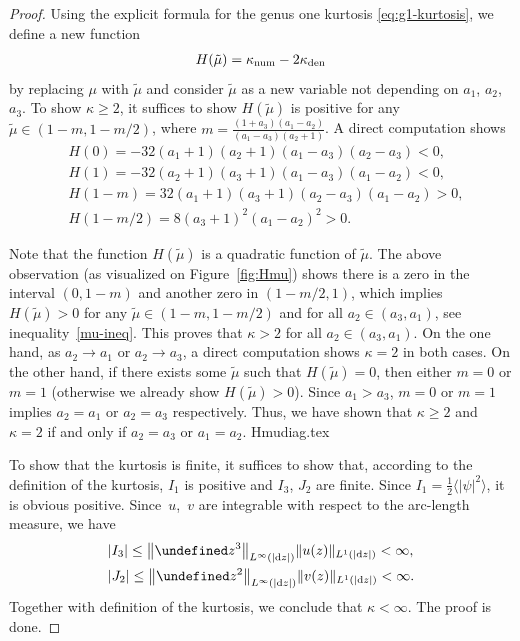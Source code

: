 \documentclass[pdftex]{sigma}
\numberwithin{equation}{section}
\let\Im\undefined
\DeclareMathOperator{\Im}{Im}
\def\ra{\rightarrow}
\begin{document}
\begin{proof}
Using the explicit formula for the genus one kurtosis \eqref{eq:g1-kurtosis}, we define a new function
\begin{align*}
H(\tilde \mu)=\kappa_{\rm num}-2\kappa_{\rm den}
\end{align*}
by replacing $\mu$ with $\tilde \mu$ and consider $\tilde \mu$ as a new variable not depending on $a_1$, $a_2$, $a_3$. To show $\kappa\geq 2$, it suffices to show $H(\tilde \mu)$ is positive for any $\tilde \mu\in (1-m,1-m/2)$, where $m=\frac{(1+a_3)(a_1-a_2)}{(a_1-a_3)(a_2+1)}$. A direct computation shows
\begin{align*}
&H(0)=-32(a_1+1)(a_2+1)(a_1-a_3)(a_2-a_3)<0,\\
&H(1)=-32(a_2+1)(a_3+1)(a_1-a_3)(a_1-a_2)<0,\\
&H(1-m)=32(a_1+1)(a_3+1)(a_2-a_3)(a_1-a_2)>0,\\
&H(1-m/2)=8(a_3+1)^2(a_1-a_2)^2>0.
\end{align*}


Note that the function $H(\tilde \mu)$ is a quadratic function of $\tilde \mu$. The above observation (as visualized on Figure~\ref{fig:Hmu}) shows there is a zero in the interval $(0,1-m)$ and another zero in $(1-m/2,1)$, which implies $H(\tilde \mu)>0$
for any $\tilde \mu \in (1-m,1-m/2)$ and for all $a_2\in (a_3,a_1)$,
see inequality~\eqref{mu-ineq}.
This proves that $\kappa>2$ for all $a_2\in (a_3,a_1)$. On the one hand, as $a_2\ra a_1$ or $a_2\ra a_3$, a direct computation shows $\kappa=2$
in both cases.
On the other hand, if there exists some $\tilde \mu$ such that $H(\tilde \mu)=0$, then either $m=0$ or $m=1$ (otherwise we already show $H(\tilde \mu)>0$). Since $a_1>a_3$, $m=0$ or $m=1$ implies $a_2=a_1$ or $a_2=a_3$ respectively. Thus, we have shown that $\kappa\geq 2$ and $\kappa=2$ if and only if $a_2=a_3$ or $a_1=a_2$.
{Hmudiag.tex}

To show that the kurtosis is finite, it suffices to show that, according to the definition of the kurtosis, $I_1$ is positive and $I_3$, $J_2$ are finite. Since $I_1=\frac{1}{2}\bigl\langle|\psi|^2\bigr\rangle$, it is obvious positive. Since~$u$,~$v$ are integrable with respect to the arc-length measure, we have
\begin{align*}
&|I_3|\leq \bigl\|\Im z^3\bigr\|_{L^\infty(|{\rm d}z|)}\|u(z)\|_{L^1(|{\rm d}z|)}<\infty,\\
&|J_2|\leq \bigl\|\Im z^2\bigr\|_{L^\infty(|{\rm d}z|)}\|v(z)\|_{L^1(|{\rm d}z|)}<\infty.
\end{align*}
Together with definition of the kurtosis, we conclude that $\kappa<\infty$. The proof is done.
\end{proof}
\end{document}
